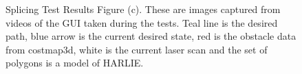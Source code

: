 \begin{figure}
\centering
\ContinuedFloat
{}
\caption[Splicing Test Results Figure (c)]{Splicing Test Results Figure (c). These are images captured from videos of the GUI taken during the tests. Teal line is the desired path, blue arrow is the current desired state, red is the obstacle data from costmap3d, white is the current laser scan and the set of polygons is a model of HARLIE.}
\label{fig:splicing_test_results}
\end{figure}

